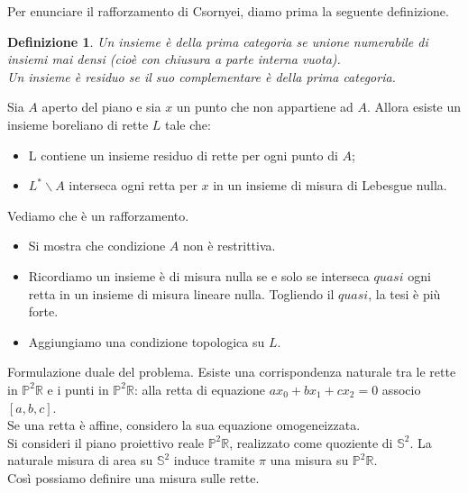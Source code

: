 \documentclass[11pt]{beamer} %
\newcommand{\R}{\mathbb{R}}
\renewcommand{\S}{\mathbb{S}}
\renewcommand{\P}{\mathbb{P}}
\newcommand{\<}{\langle}
\renewcommand{\>}{\rangle}
\theoremstyle{theorem}
\theoremstyle{theorem}
\theoremstyle{theorem}
\theoremstyle{theorem}
\newtheorem{defin}[teo]{Definizione}
\theoremstyle{theorem}
\begin{document}
\begin{frame}[fragile]
	Per enunciare il rafforzamento di Csornyei, diamo prima la seguente definizione.\\
	
	\begin{defin}
	Un insieme è della prima categoria se unione numerabile di insiemi mai densi (cioè con chiusura a parte interna vuota).\\
	Un insieme è residuo se il suo complementare è della prima categoria. 
	\end{defin}

\end{frame}

\begin{frame}[fragile]

\begin{lemma}
	Sia $A$ aperto del piano e sia $x$ un punto che non appartiene ad $A$. Allora esiste un insieme boreliano di rette $L$ tale che:\\
	\begin{itemize}
		\item L contiene un insieme residuo di rette per ogni punto di $A$;\\
		\item $L^{*} \backslash A$ interseca ogni retta per $x$ in un insieme di misura di Lebesgue nulla.\\
	\end{itemize}
\end{lemma}


	Vediamo che è un rafforzamento.\\
	\begin{itemize}
		\item Si mostra che condizione $A$ non è restrittiva.\\
		\item Ricordiamo un insieme è di misura nulla se e solo se interseca $quasi$ ogni retta in un insieme di misura lineare nulla. Togliendo il $quasi$, la tesi è più forte.\\
		\item Aggiungiamo una condizione topologica su $L$.
	\end{itemize}

\end{frame}

\begin{frame}[fragile]

Formulazione duale del problema.
Esiste una corrispondenza naturale tra le rette in $\P^2 \R$ e i punti in $\P^2\R$: alla retta di equazione $ax_0+bx_1+cx_2=0$ associo $[a,b,c]$.\\
Se una retta è affine, considero la sua equazione omogeneizzata.\\
Si consideri il piano proiettivo reale $\P^2 \R$, realizzato come quoziente di $\S^2$. La naturale misura di area su $\S^2$ induce tramite $\pi$ una misura su $\P^2\R$.\\
Così possiamo definire una misura sulle rette.
\end{frame}
\end{document}
